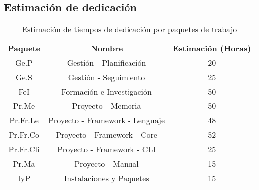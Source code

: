 \subsection{Estimación de dedicación}

\begin{table}[H]
    \centering
    \begin{tabular}{ccc}
    \textbf{Paquete} & \textbf{Nombre}                 & \textbf{Estimación (Horas)} \\
    Ge.P             & Gestión - Planificación         & 20                          \\
    Ge.S             & Gestión - Seguimiento           & 25                          \\
    FeI              & Formación e Investigación       & 50                          \\
    Pr.Me            & Proyecto - Memoria              & 50                          \\
    Pr.Fr.Le         & Proyecto - Framework - Lenguaje & 48                          \\
    Pr.Fr.Co         & Proyecto - Framework - Core     & 52                          \\
    Pr.Fr.Cli        & Proyecto - Framework - CLI      & 25                          \\
    Pr.Ma            & Proyecto - Manual               & 15                          \\
    IyP              & Instalaciones y Paquetes        & 15                          \\
    \end{tabular}
    \caption{Estimación de tiempos de dedicación por paquetes de trabajo}
    \label{tab:estimacion-paquetes}
\end{table}




